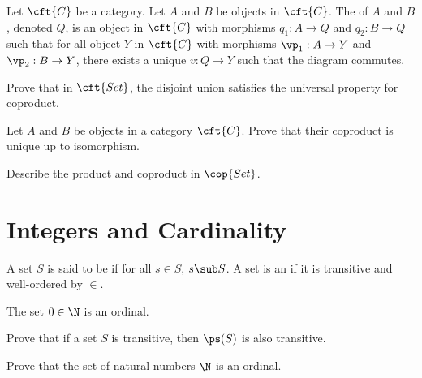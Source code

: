 \documentclass[10pt]{article}
\begin{document}
\begin{definition}
    Let $\cft{C}$ be a category. Let $A$ and $B$ be objects in $\cft{C}$. The  of $A$ and $B$, denoted $Q$, is an object in $\cft{C}$ with morphisms ${q}_{1}:A\to Q$ and ${q}_{2}:B\to Q$ such that for all object $Y$ in $\cft{C}$ with morphisms ${\vp}_{1}:A\to Y$ and ${\vp}_{2}:B\to Y$, there exists a unique $v:Q\to Y$ such that the diagram commutes.
\end{definition}
\begin{center}
\end{center}
\begin{problem}
    Prove that in $\cft{Set}$, the disjoint union satisfies the universal property for coproduct.
\end{problem}
\begin{problem}
    Let $A$ and $B$ be objects in a category $\cft{C}$. Prove that their coproduct is unique up to isomorphism.
\end{problem}
\begin{problem}
    Describe the product and coproduct in $\cop{Set}$. 
\end{problem}
\section{Integers and Cardinality}
\begin{definition}
    A set $S$ is said to be  if for all $s\in S$, $s\sub S$. A set is an  if it is transitive and well-ordered by $\in$.
\end{definition}
\begin{example}
    The set $0\in\N$ is an ordinal.
\end{example}
\begin{problem}
    Prove that if a set $S$ is transitive, then $\ps(S)$ is also transitive.
\end{problem}
\begin{problem}
    Prove that the set of natural numbers $\N$ is an ordinal.
\end{problem}
\begin{theorem}
    
\end{theorem}
\end{document}
